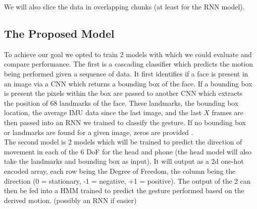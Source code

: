 We will also slice the data in overlapping chunks (at least for the RNN model).



\subsection{The Proposed Model} %
%
To achieve our goal we opted to train 2 models with which we could evaluate and compare performance.
The first is a cascading classifier which predicts the motion being performed given a sequence of data.
It first identifies if a face is present in an image via a CNN which returns a bounding box of the face\cite{yu2022yunet}. If a bounding box is present the pixels within the box are passed to another CNN which extracts the position of 68 landmarks of the face\cite{guobing2021headpose}.
These landmarks, the bounding box location, the average IMU data since the last image, and the last $X$ frames are then passed into an RNN we trained to classify the gesture.
If no bounding box or landmarks are found for a given image, zeros are provided .
\\
The second model is 2 models which will be trained to predict the direction of movement in each of the 6 DoF for the head and phone (the head model will also take the landmarks and bounding box as input).
It will output as a 2d one-hot encoded array, each row being the Degree of Freedom, the column being the direction (0 = stationary, -1 = negative, +1 = positive).
The output of the 2 can then be fed into a HMM trained to predict the gesture performed based on the derived motion. (possibly an RNN if easier)

